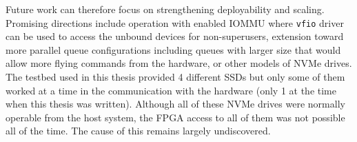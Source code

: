 Future work can therefore focus on strengthening deployability and scaling. Promising directions
include operation with enabled IOMMU where \verb|vfio| driver can be used to access the unbound
devices for non-superusers, extension toward more parallel queue configurations including queues
with larger size that would allow more flying commands from the hardware, or other models of NVMe
drives. The testbed used in this thesis provided 4 different SSDs but only some of them worked at a
time in the communication with the hardware (only 1 at the time when this thesis was written).
Although all of these NVMe drives were normally operable from the host system, the FPGA access to
all of them was not possible all of the time. The cause of this remains largely undiscovered.
